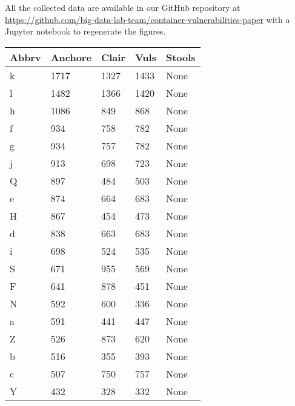 All the collected
data are available in our GitHub repository at
\url{https://github.com/big-data-lab-team/container-vulnerabilities-paper}
with a Jupyter notebook to regenerate the figures.
\begin{center}
\tabulinesep=1.2mm
        \begin{longtable} {| p{} | p{} | p{} | p{} | p{} |}
 \hline
		\textbf{Abbrv}  &    \textbf{Anchore}   &   \textbf{Clair}  &   \textbf{Vuls}   &   \textbf{Stools}    \\   
\hline
k  &    1717   &   1327  &   1433   &   None    \\   
\hline
l  &    1482   &   1366  &   1420   &   None    \\   
\hline
h  &    1086   &   849  &   868   &   None    \\   
\hline
f  &    934   &   758  &   782   &   None    \\   
\hline
g  &    934   &   757  &   782   &   None    \\   
\hline
j  &    913   &   698  &   723   &   None    \\   
\hline
Q  &    897   &   484  &   503   &   None    \\   
\hline
e  &    874   &   664  &   683   &   None    \\   
\hline
H  &    867   &   454  &   473   &   None    \\   
\hline
d  &    838   &   663  &   683   &   None    \\   
\hline
i  &    698   &   524  &   535   &   None    \\   
\hline
S  &    671   &   955  &   569   &   None    \\   
\hline
F  &    641   &   878  &   451   &   None    \\   
\hline
N  &    592   &   600  &   336   &   None    \\   
\hline
a  &    591   &   441  &   447   &   None    \\   
\hline
Z  &    526   &   873  &   620   &   None    \\   
\hline
b  &    516   &   355  &   393   &   None    \\   
\hline
c  &    507   &   750  &   757   &   None    \\   
\hline
Y  &    432   &   328  &   332   &   None    \\   
\hline

\end{longtable}
\end{center}
